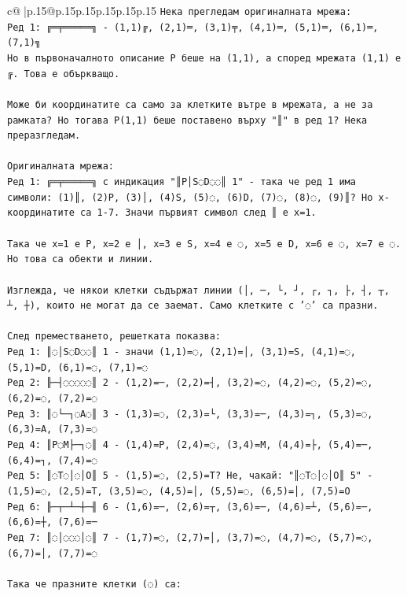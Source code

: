 \documentclass{article}
\begin{document}
{\begin{supertabular}{c@{$\;$}|p{.15\linewidth}@{}p{.15\linewidth}p{.15\linewidth}p{.15\linewidth}p{.15\linewidth}p{.15\linewidth}}
{{{\texttt{Нека прегледам оригиналната мрежа:} \\
\texttt{Ред 1: ╔═╤═════╗ {-} (1,1)╔, (2,1)═, (3,1)╤, (4,1)═, (5,1)═, (6,1)═, (7,1)╗} \\
\texttt{Но в първоначалното описание P беше на (1,1), а според мрежата (1,1) е ╔. Това е объркващо.} \\
\\ 
\texttt{Може би координатите са само за клетките вътре в мрежата, а не за рамката? Но тогава P(1,1) беше поставено върху "║" в ред 1? Нека преразгледам.} \\
\\ 
\texttt{Оригиналната мрежа:} \\
\texttt{Ред 1: ╔═╤═════╗ с индикация "║P│S◌D◌◌║ 1" {-} така че ред 1 има символи: (1)║, (2)P, (3)│, (4)S, (5)◌, (6)D, (7)◌, (8)◌, (9)║? Но x{-}координатите са 1{-}7. Значи първият символ след ║ е x=1.} \\
\\ 
\texttt{Така че x=1 е P, x=2 е │, x=3 е S, x=4 е ◌, x=5 е D, x=6 е ◌, x=7 е ◌. Но това са обекти и линии.} \\
\\ 
\texttt{Изглежда, че някои клетки съдържат линии (│, ─, └, ┘, ┌, ┐, ├, ┤, ┬, ┴, ┼), които не могат да се заемат. Само клетките с '◌' са празни.} \\
\\ 
\texttt{След преместването, решетката показва:} \\
\texttt{Ред 1: ║◌│S◌D◌◌║ 1 {-} значи (1,1)=◌, (2,1)=│, (3,1)=S, (4,1)=◌, (5,1)=D, (6,1)=◌, (7,1)=◌} \\
\texttt{Ред 2: ╟─┤◌◌◌◌◌║ 2 {-} (1,2)=─, (2,2)=┤, (3,2)=◌, (4,2)=◌, (5,2)=◌, (6,2)=◌, (7,2)=◌} \\
\texttt{Ред 3: ║◌└─┐◌A◌║ 3 {-} (1,3)=◌, (2,3)=└, (3,3)=─, (4,3)=┐, (5,3)=◌, (6,3)=A, (7,3)=◌} \\
\texttt{Ред 4: ║P◌M├─┐◌║ 4 {-} (1,4)=P, (2,4)=◌, (3,4)=M, (4,4)=├, (5,4)=─, (6,4)=┐, (7,4)=◌} \\
\texttt{Ред 5: ║◌T◌│◌│O║ 5 {-} (1,5)=◌, (2,5)=T? Не, чакай: "║◌T◌│◌│O║ 5" {-} (1,5)=◌, (2,5)=T, (3,5)=◌, (4,5)=│, (5,5)=◌, (6,5)=│, (7,5)=O} \\
\texttt{Ред 6: ╟─┬─┴─┼─╢ 6 {-} (1,6)=─, (2,6)=┬, (3,6)=─, (4,6)=┴, (5,6)=─, (6,6)=┼, (7,6)=─} \\
\texttt{Ред 7: ║◌│◌◌◌│◌║ 7 {-} (1,7)=◌, (2,7)=│, (3,7)=◌, (4,7)=◌, (5,7)=◌, (6,7)=│, (7,7)=◌} \\
\\ 
\texttt{Така че празните клетки (◌) са:} \\
}}}
\end{supertabular}}
\end{document}
